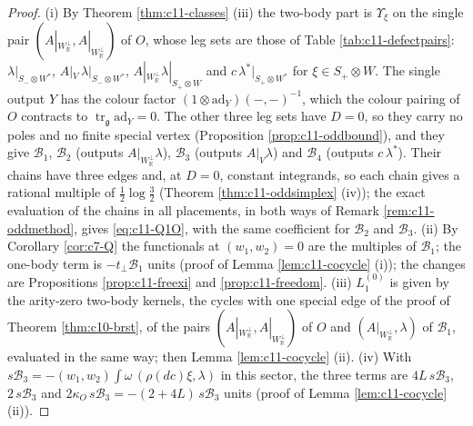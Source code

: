 \begin{proof}
(i) By Theorem \ref{thm:c11-classes} (iii) the two-body part is $\Upsilon_\xi$ on the single pair $(A|_{W_{\mathbb R}^\perp},A|_{W_{\mathbb R}^\perp})$ of $O$, whose leg sets are those of Table \ref{tab:c11-defectpairs}: $\lambda|_{S_-\otimes W^*}$, $A|_V\,\lambda|_{S_-\otimes W^*}$, $A|_{W_{\mathbb R}^\perp}\lambda|_{S_+\otimes W}$ and $c\,\lambda^*|_{S_+\otimes W^*}$ for $\xi\in S_+\otimes W$. The single output $Y$ has the colour factor $(1\otimes\mathrm{ad}_Y)(-,-)^{-1}$, which the colour pairing of $O$ contracts to $\operatorname{tr}_{\mathfrak g}\mathrm{ad}_Y=0$. The other three leg sets have $D=0$, so they carry no poles and no finite special vertex (Proposition \ref{prop:c11-oddbound}), and they give $\mathcal B_1$, $\mathcal B_2$ (outputs $A|_{W_{\mathbb R}^\perp}\lambda$), $\mathcal B_3$ (outputs $A|_V\lambda$) and $\mathcal B_4$ (outputs $c\,\lambda^*$). Their chains have three edges and, at $D=0$, constant integrands, so each chain gives a rational multiple of $\tfrac12\log\tfrac32$ (Theorem \ref{thm:c11-oddsimplex} (iv)); the exact evaluation of the chains in all placements, in both ways of Remark \ref{rem:c11-oddmethod}, gives \eqref{eq:c11-Q1O}, with the same coefficient for $\mathcal B_2$ and $\mathcal B_3$. (ii) By Corollary \ref{cor:c7-Q} the functionals at $(w_1,w_2)=0$ are the multiples of $\mathcal B_1$; the one-body term is $-t_\perp\mathcal B_1$ units (proof of Lemma \ref{lem:c11-cocycle} (i)); the changes are Propositions \ref{prop:c11-freexi} and \ref{prop:c11-freedom}. (iii) $L_1^{(0)}$ is given by the arity-zero two-body kernels, the cycles with one special edge of the proof of Theorem \ref{thm:c10-brst}, of the pairs $(A|_{W_{\mathbb R}^\perp},A|_{W_{\mathbb R}^\perp})$ of $O$ and $(A|_{W_{\mathbb R}^\perp},\lambda)$ of $\mathcal B_1$, evaluated in the same way; then Lemma \ref{lem:c11-cocycle} (ii). (iv) With $s\mathcal B_3=-(w_1,w_2)\int\omega\,(\rho(dc)\xi,\lambda)$ in this sector, the three terms are $4L\,s\mathcal B_3$, $2\,s\mathcal B_3$ and $2\kappa_O\,s\mathcal B_3=-(2+4L)\,s\mathcal B_3$ units (proof of Lemma \ref{lem:c11-cocycle} (ii)).
\end{proof}

